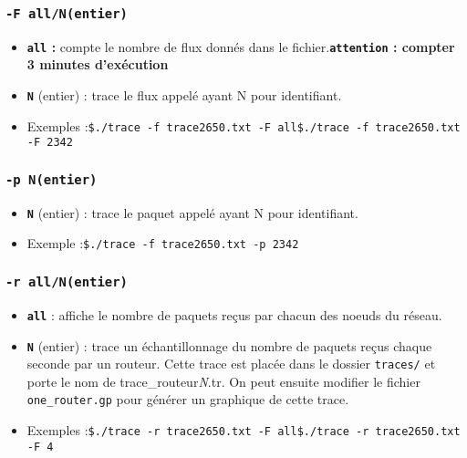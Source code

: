 \documentclass[
10pt, %
a4paper, %
oneside, %
headinclude,footinclude, %
BCOR5mm, %
]{scrartcl}
\begin{document}
\subsubsection{\texttt{-F all/N(entier)}}
\begin{itemize}
  \item \textbf{\texttt{all} : }
compte le nombre de flux donnés dans le fichier.\newline \textbf{\texttt{attention} : compter 3 minutes d'exécution}
  \item \textbf{\texttt{N}} (entier) : trace le flux appelé ayant N pour identifiant.
  \item Exemples :\newline\texttt{\$./trace -f trace2650.txt -F all}\newline\texttt{\$./trace -f trace2650.txt -F 2342}
\end{itemize}
\subsubsection{\texttt{-p N(entier)}}
\begin{itemize}
  \item \textbf{\texttt{N}} (entier) : trace le paquet appelé ayant N pour identifiant.
  \item Exemple :\newline\texttt{\$./trace -f trace2650.txt -p 2342}
\end{itemize}

\subsubsection{\texttt{-r all/N(entier)}}
\begin{itemize}
  \item \textbf{\texttt{all}} : affiche le nombre de paquets reçus par chacun des noeuds du réseau.
  \item \textbf{\texttt{N}} (entier) : trace un échantillonnage du nombre de paquets reçus chaque seconde par un routeur. Cette trace est placée dans le dossier \texttt{traces/} et porte le nom de trace\_routeur\textit{N}.tr. On peut ensuite modifier le fichier \texttt{one\_router.gp} pour générer un graphique de cette trace.
  \item Exemples :\newline\texttt{\$./trace -r trace2650.txt -F all}\newline\texttt{\$./trace -r trace2650.txt -F 4}
\end{itemize}
  
\end{document}
